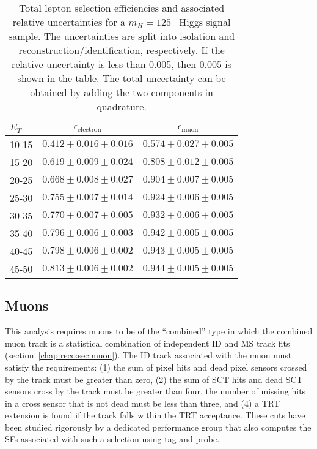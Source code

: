 \begin{table}[h]
\centering
\begin{tabular}{l|c|c}
\hline
$E_{T}$ & $\epsilon_{\textrm{electron}}$ & $\epsilon_{\textrm{muon}}$
\\ \hline
10-15 & $0.412 \pm 0.016 \pm 0.016$ & $0.574 \pm 0.027 \pm 0.005$ \\
15-20 & $0.619 \pm 0.009 \pm 0.024$ & $0.808 \pm 0.012 \pm 0.005$ \\
20-25 & $0.668 \pm 0.008 \pm 0.027$ & $0.904 \pm 0.007 \pm 0.005$ \\
25-30 & $0.755 \pm 0.007 \pm 0.014$ & $0.924 \pm 0.006 \pm 0.005$ \\
30-35 & $0.770 \pm 0.007 \pm 0.005$ & $0.932 \pm 0.006 \pm 0.005$ \\
35-40 & $0.796 \pm 0.006 \pm 0.003$ & $0.942 \pm 0.005 \pm 0.005$ \\
40-45 & $0.798 \pm 0.006 \pm 0.002$ & $0.943 \pm 0.005 \pm 0.005$ \\
45-50 & $0.813 \pm 0.006 \pm 0.002$ & $0.944 \pm 0.005 \pm 0.005$ \\
\hline
\end{tabular}
\caption[Total lepton selection efficiencies and associated
  relative uncertainties.]{Total lepton selection efficiencies and associated
  relative uncertainties for a $m_H= 125$ \gev~Higgs signal
  sample. The uncertainties are split into isolation and
  reconstruction/identification, respectively. If the relative
  uncertainty is less than 0.005, then 0.005 is shown in the
  table. The total uncertainty can be obtained by adding the two
  components in quadrature.}
\label{chap:analysis:tab:lepton_eff}
\end{table}

\subsection{Muons}

This analysis requires muons to be of the ``combined'' type in which
the combined muon track is a statistical combination of independent ID and MS
track fits (section~\ref{chap:reco:sec:muon}). The ID track associated
with the muon must satisfy the requirements: (1) the sum of pixel hits
and dead pixel sensors crossed by the track must be greater than zero,
(2) the sum of SCT hits and dead SCT sensors cross by the track must
be greater than four, the number of missing hits in a cross sensor
that is not dead must be less than three, and (4) a TRT extension is
found if the track falls within the TRT acceptance. These cuts have
been studied rigorously by a dedicated performance group that also
computes the SFs associated with such a selection using
tag-and-probe. 

